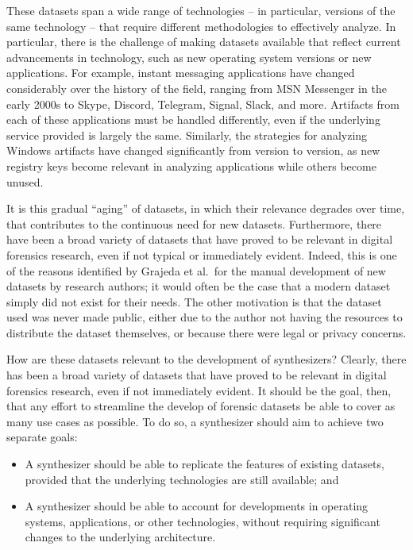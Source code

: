 These datasets span a wide range of technologies -- in particular,
versions of the same technology -- that require different methodologies
to effectively analyze. In particular, there is the challenge of making
datasets available that reflect current advancements in technology, such
as new operating system versions or new applications. For example,
instant messaging applications have changed considerably over the
history of the field, ranging from MSN Messenger in the early 2000s to
Skype, Discord, Telegram, Signal, Slack, and more. Artifacts from each
of these applications must be handled differently, even if the
underlying service provided is largely the same. Similarly, the
strategies for analyzing Windows artifacts have changed significantly
from version to version, as new registry keys become relevant in
analyzing applications while others become unused.

It is this gradual ``aging'' of datasets, in which their relevance
degrades over time, that contributes to the continuous need for new
datasets. Furthermore, there have been a broad variety of datasets that
have proved to be relevant in digital forensics research, even if not
typical or immediately evident. Indeed, this is one of the reasons
identified by Grajeda et al.~for the manual development of new datasets
by research authors; it would often be the case that a modern dataset
simply did not exist for their needs. The other motivation is that the
dataset used was never made public, either due to the author not having
the resources to distribute the dataset themselves, or because there
were legal or privacy concerns.

How are these datasets relevant to the development of synthesizers?
Clearly, there has been a broad variety of datasets that have proved to
be relevant in digital forensics research, even if not immediately
evident. It should be the goal, then, that any effort to streamline the
develop of forensic datasets be able to cover as many use cases as
possible. To do so, a synthesizer should aim to achieve two separate
goals:

\begin{itemize}
\tightlist
\item
  A synthesizer should be able to replicate the features of existing
  datasets, provided that the underlying technologies are still
  available; and
\item
  A synthesizer should be able to account for developments in operating
  systems, applications, or other technologies, without requiring
  significant changes to the underlying architecture.
\end{itemize}

